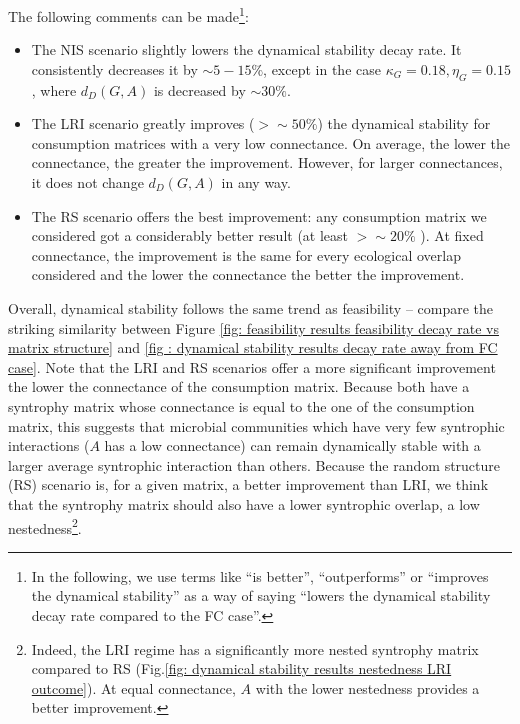 \documentclass[12pt, titlepage]{report}
\begin{document}
The following comments can be made\footnote{In the following, we use terms like ``is better'', ``outperforms'' or ``improves the dynamical stability'' as a way of saying ``lowers the dynamical stability decay rate compared to the FC case''.}:
\begin{itemize}
\item The NIS scenario slightly lowers the dynamical stability decay rate. It consistently decreases it by $\sim 5-15\%$, except in the case $\kappa_G = 0.18, \eta_G=0.15$, where $d_D(G,A)$ is decreased by $\sim 30\%$.
\item The LRI scenario greatly improves ($> \sim 50\%$) the dynamical stability for consumption matrices with a very low connectance. On average, the lower the connectance, the greater the improvement. However, for larger connectances, it does not change $d_D(G,A)$ in any way.
\item The RS scenario offers the best improvement: any consumption matrix we considered got a considerably better result (at least $>\sim 20 \%$ ). At fixed connectance, the improvement is the same for every ecological overlap considered and the lower the connectance the better the improvement.
\end{itemize}
Overall, dynamical stability follows the same trend as feasibility -- compare the striking similarity between Figure \ref{fig: feasibility results feasibility decay rate vs matrix structure} and \ref{fig : dynamical stability results decay rate away from FC case}. Note that the LRI and RS scenarios offer a more significant improvement the lower the connectance of the consumption matrix. Because both have a syntrophy matrix whose connectance is equal to the one of the consumption matrix, this suggests that microbial communities which have very few syntrophic interactions (\ie $A$ has a low connectance) can remain dynamically stable with a larger average syntrophic interaction than others. Because the random structure (RS) scenario is, for a given matrix, a better improvement than LRI, we think that the syntrophy matrix should also have a lower syntrophic overlap, \ie a low nestedness\footnote{Indeed, the LRI regime has a significantly more nested syntrophy matrix compared to RS (Fig.\ref{fig: dynamical stability results nestedness LRI outcome}). At equal connectance, $A$ with the lower nestedness provides a better improvement.}.
\end{document}
